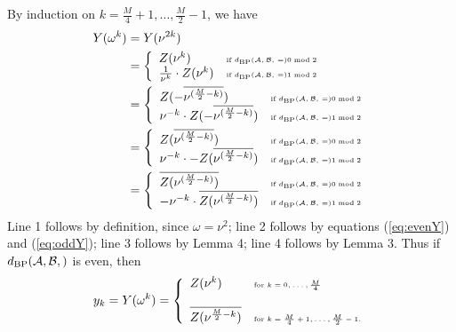 By induction on $k=\frac{M}{4}+1,\dots,\frac{M}{2}-1$, we have
\begin{align}
Y(\omega^k)&= Y(\nu^{2k})  \nonumber \\
&= \left\{ \begin{array}{ll}
Z(\nu^{k}) &\mbox{\tiny if
$d_{\text{BP}}(\mathcal A,\mathcal B,\,=) 0 \bmod 2$}\\
\frac{1}{\nu^{k}} \cdot Z(\nu^{k})
&\mbox{\tiny if
$d_{\text{BP}}(\mathcal A,\mathcal B,\,=) 1 \bmod 2$}\\
\end{array} \right. \nonumber\\
&= \left\{ \begin{array}{ll}
Z(- \overline{\nu^{(\frac{M}{2}-k)}}) &\mbox{\tiny if
$d_{\text{BP}}(\mathcal A,\mathcal B,\,=) 0 \bmod 2$}\\
\nu^{-k} \cdot
Z(-\overline{\nu^{(\frac{M}{2}-k)}})
&\mbox{\tiny if
$d_{\text{BP}}(\mathcal A,\mathcal B,\,=) 1 \bmod 2$}\\
\end{array} \right. \nonumber\\
&= \left\{ \begin{array}{ll}
Z(\overline{\nu^{(\frac{M}{2}-k)}}) &\mbox{\tiny if
$d_{\text{BP}}(\mathcal A,\mathcal B,\,=) 0 \bmod 2$}\\
\nu^{-k} \cdot
-Z(\overline{\nu^{(\frac{M}{2}-k)}})
&\mbox{\tiny if
$d_{\text{BP}}(\mathcal A,\mathcal B,\,=) 1 \bmod 2$}\\
\end{array} \right.  \nonumber\\
&= \left\{ \begin{array}{ll}
\overline{Z(\nu^{(\frac{M}{2}-k)})} &\mbox{\tiny if
$d_{\text{BP}}(\mathcal A,\mathcal B,\,=) 0 \bmod 2$}\\
-\nu^{-k} \cdot
\overline{Z(\nu^{(\frac{M}{2}-k)})}
&\mbox{\tiny if
$d_{\text{BP}}(\mathcal A,\mathcal B,\,=) 1 \bmod 2$}\\
\end{array} \right.  \nonumber\\
\end{align}
Line 1 follows by definition, since $\omega=\nu^2$;
line 2 follows by equations (\ref{eq:evenY}) and
(\ref{eq:oddY});
line 3 follows by Lemma 4;
line 4 follows by Lemma 3.
Thus if $\dBP{\strA,\strB}$ is even, then
\begin{align}
\label{eq:trickyRootsOfUnity1}
y_k = Y(\omega^k) = \left\{
\begin{array}{ll}
Z(\nu^k) &\mbox{\tiny for $k=0,\dots,\frac{M}{4}$}\\
\quad & \quad\\
\overline{Z(\nu^{\frac{M}{2}-k})} &\mbox{\tiny for $k=\frac{M}{4}+1,\dots,\frac{M}{2}-1$.}\\
\end{array} \right.
\end{align}
